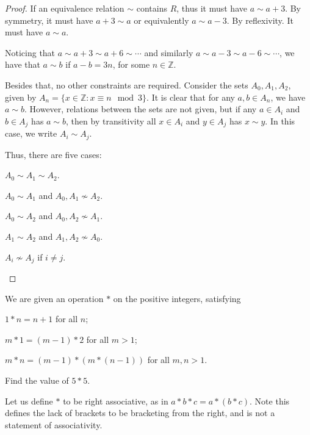 \documentclass[12pt]{article}
\begin{document}

\begin{proof}
    If an equivalence relation $\sim$ contains $R$,
    thus it must have $a \sim a + 3$.
    By symmetry, it must have $a + 3 \sim a$ or equivalently $a \sim a - 3$.
    By reflexivity. It must have $a \sim a$.

    Noticing that $a \sim a + 3 \sim a + 6 \sim \cdots$ and similarly
    $a \sim a - 3 \sim a - 6 \sim \cdots$, we have that
    $a \sim b$ if $a - b = 3n$, for some $n \in \mathbb{Z}$.

    Besides that, no other constraints are required.
    Consider the sets $A_0,A_1,A_2$, given by $A_n = \{x \in \mathbb{Z} : x \equiv n \mod 3\}$.
    It is clear that for any $a,b \in A_n$, we have $a \sim b$.
    However, relations between the sets are not given,
    but if any $a \in A_i$ and $b \in A_j$ has $a \sim b$,
    then by transitivity all $x \in A_i$ and $y \in A_j$ has $x \sim y$.
    In this case, we write $A_i \sim A_j$.

    Thus, there are five cases:
    \begin{compactenum}
    \item $A_0 \sim A_1 \sim A_2$.
    \item $A_0 \sim A_1$ and $A_0,A_1 \nsim A_2$.
    \item $A_0 \sim A_2$ and $A_0,A_2 \nsim A_1$.
    \item $A_1 \sim A_2$ and $A_1,A_2 \nsim A_0$.
    \item $A_i \nsim A_j$ if $i \ne j$.
    \end{compactenum}
\end{proof}

\begin{question}
    We are given an operation $*$ on the positive integers, satisfying
    \begin{compactenum}[(i)]
    \item $1 * n = n + 1$ for all $n$;
    \item $m * 1 = (m - 1) * 2$ for all $m > 1$;
    \item $m * n = (m - 1) * (m * (n - 1))$ for all $m,n > 1$.
    \end{compactenum}
    Find the value of $5 * 5$.
\end{question}

Let us define $*$ to be right associative,
as in $a * b * c = a * (b * c)$.
Note this defines the lack of brackets
to be bracketing from the right, and is
not a statement of associativity.
\end{document}
